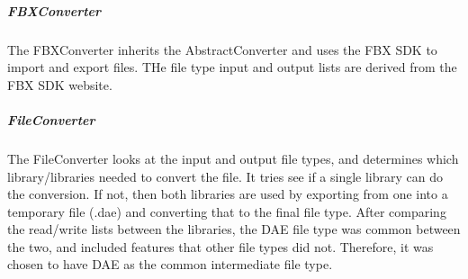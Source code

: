     \subparagraph{FBXConverter}
    \hfill \break
    The FBXConverter inherits the AbstractConverter and uses the FBX SDK to import and export files.
    THe file type input and output lists are derived from the FBX SDK website.

    \subparagraph{FileConverter}
    \hfill \break
    The FileConverter looks at the input and output file types, and determines which library/libraries needed to convert the file.
    It tries see if a single library can do the conversion.  If not, then both libraries are used by exporting from one into a 
    temporary file (.dae) and converting that to the final file type. After comparing the read/write lists between the libraries,
    the DAE file type was common between the two, and included features that other file types did not.  Therefore, it was chosen
    to have DAE as the common intermediate file type.

